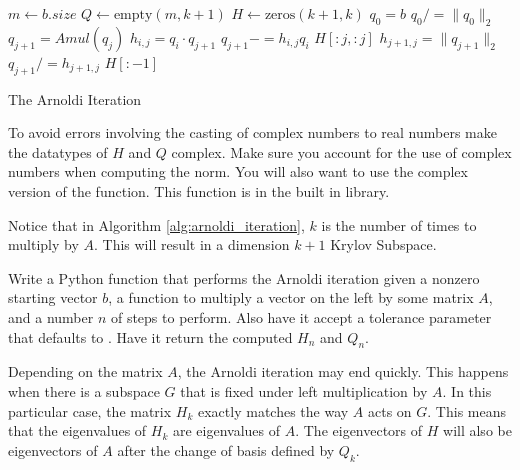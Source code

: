 \begin{algorithm}
\begin{algorithmic}[1]
	\State $m \gets b.size$						
	\State $Q \gets \text{empty}\left(m, k+1\right)$
	\State $H \gets \text{zeros}\left( k+1, k\right)$
	\State $q_0 = b$							
	\State $q_0 /= \|q_0\|_2$						
								
		\State $q_{j+1} = Amul \left(q_j\right)$		
							
			\State $h_{i,j} = q_i \cdot q_{j+1}$		
			\State $q_{j+1} -= h_{i,j} q_i$
		\EndFor
							
			\State {} $H[:j,:j]$
		\EndIf
		\State $h_{j+1,j} = \|q_{j+1}\|_2$			
		\State $q_{j+1} /= h_{j+1,j}$				
	\EndFor
	\State {} $H[:-1]$				
\EndProcedure
\end{algorithmic}
\caption{The Arnoldi Iteration}
\label{alg:arnoldi_iteration}
\end{algorithm}

\begin{warn}
To avoid errors involving the casting of complex numbers to real numbers make the datatypes of $H$ and $Q$ complex.
Make sure you account for the use of complex numbers when computing the norm.
You will also want to use the complex version of the  function.
This function is in the built in  library.
\end{warn}

Notice that in Algorithm \ref{alg:arnoldi_iteration}, $k$ is the number of times to multiply by $A$.
This will result in a dimension $k+1$ Krylov Subspace.

\begin{problem}
Write a Python function that performs the Arnoldi iteration given a nonzero starting vector $b$, a function to multiply a 
vector on the left by some matrix $A$, and a number $n$ of steps to perform.
Also have it accept a tolerance parameter that defaults to .
Have it return the computed $H_n$ and $Q_n$.
\end{problem}

\begin{info}
Depending on the matrix $A$, the Arnoldi iteration may end quickly.
This happens when there is a subspace $G$ that is fixed under left multiplication by $A$.
In this particular case, the matrix $H_k$ exactly matches the way $A$ acts on $G$.
This means that the eigenvalues of $H_k$ are eigenvalues of $A$.
The eigenvectors of $H$ will also be eigenvectors of $A$ after the change of basis defined by $Q_k$.
\end{info}

